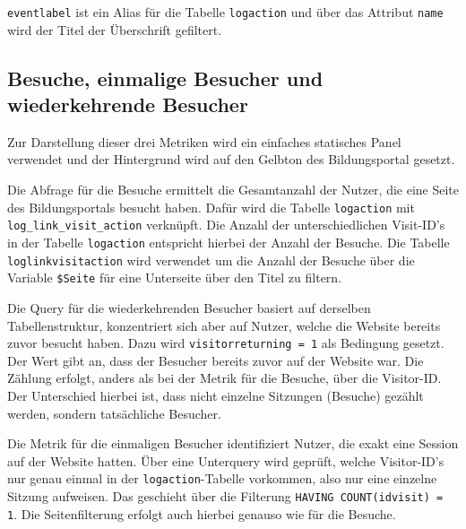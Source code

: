 \begin{figure}[H]
    \centering
    \begin{minipage}{\textwidth}
        
    \end{minipage}
\end{figure}

\texttt{event\textunderscore label} ist ein Alias für die Tabelle \texttt{log\textunderscore action} und über das Attribut \texttt{name} wird der Titel der Überschrift gefiltert.

\subsection{Besuche, einmalige Besucher und wiederkehrende Besucher}
Zur Darstellung dieser drei Metriken wird ein einfaches statisches Panel verwendet und der Hintergrund wird auf den Gelbton des Bildungsportal gesetzt.

Die Abfrage für die Besuche ermittelt die Gesamtanzahl der Nutzer, die eine Seite des Bildungsportals besucht haben. Dafür wird die Tabelle \texttt{log\textunderscore action} mit \texttt{log\allowbreak\_link\allowbreak\_visit\allowbreak\_action} verknüpft. Die Anzahl der unterschiedlichen Visit-ID's in der Tabelle \texttt{log\textunderscore action} entspricht hierbei der Anzahl der Besuche. Die Tabelle \texttt{log\textunderscore link\textunderscore visit\textunderscore action} wird verwendet um die Anzahl der Besuche über die Variable \texttt{\$Seite} für eine Unterseite über den Titel zu filtern.

Die Query für die wiederkehrenden Besucher basiert auf derselben Tabellenstruktur, konzentriert sich aber auf Nutzer, welche die Website bereits zuvor besucht haben. Dazu wird \texttt{visitor\textunderscore returning = 1} als Bedingung gesetzt. Der Wert \grqq{} gibt an, dass der Besucher bereits zuvor auf der Website war. Die Zählung erfolgt, anders als bei der Metrik für die Besuche, über die Visitor-ID. Der Unterschied hierbei ist, dass nicht einzelne Sitzungen (Besuche) gezählt werden, sondern tatsächliche Besucher.

Die Metrik für die einmaligen Besucher identifiziert Nutzer, die exakt eine Session auf der Website hatten. Über eine Unterquery wird geprüft, welche Visitor-ID's nur genau einmal in der \texttt{log\textunderscore action}-Tabelle vorkommen, also nur eine einzelne Sitzung aufweisen. Das geschieht über die Filterung \texttt{HAVING COUNT(idvisit) = 1}. Die Seitenfilterung erfolgt auch hierbei genauso wie für die Besuche.

